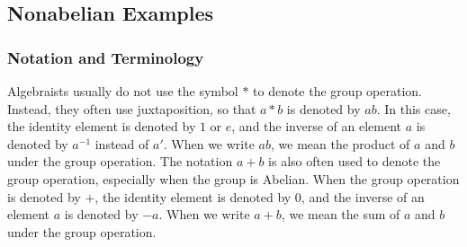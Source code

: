 \subsection{Nonabelian Examples}



\subsubsection{Notation and Terminology}

Algebraists usually do not use the symbol $*$ to denote the group operation. Instead, they often use juxtaposition, so that $a*b$ is denoted by $ab$. In this case, the identity element is denoted by $1$ or $e$, and the inverse of an element $a$ is denoted by $a^{-1}$ instead of $a'$. When we write $ab$, we mean the product of $a$ and $b$ under the group operation. The notation $a+b$ is also often used to denote the group operation, especially when the group is Abelian. When the group operation is denoted by $+$, the identity element is denoted by $0$, and the inverse of an element $a$ is denoted by $-a$. When we write $a+b$, we mean the sum of $a$ and $b$ under the group operation.





